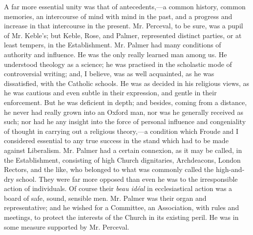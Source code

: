 A far more essential unity was that of antecedents,—a common
history, common memories, an intercourse of mind with mind in the past,
and a progress and increase in
that intercourse in the present. Mr.
Perceval, to be sure, was a pupil of Mr. Keble's; but Keble, Rose, and
Palmer, represented distinct parties, or at least tempers, in the
Establishment. Mr. Palmer had many conditions of authority and
influence. He was the only really learned man among us. He understood
theology as a science; he was practised in the scholastic mode of
controversial writing; and, I believe, was as well acquainted, as he was
dissatisfied, with the Catholic schools. He was as decided in his
religious views, as he was cautious and even subtle in their expression,
and gentle in their enforcement. But he was deficient in depth; and
besides, coming from a distance, he never had really grown into an
Oxford man, nor was he generally received as such; nor had he any
insight into the force of personal influence and congeniality of thought
in carrying out a religious theory,—a condition which Froude and I
considered essential to any true success in the stand which had to be
made against Liberalism. Mr. Palmer had a certain connexion, as it may
be called, in the Establishment, consisting of high Church dignitaries,
Archdeacons, London Rectors, and the like, who belonged to what was
commonly called the high-and-dry school. They were far more opposed than
even he was to the irresponsible action of individuals. Of course their \emph{beau
idéal} in ecclesiastical action was a board of safe, sound, sensible
men. Mr. Palmer was their organ and representative; and he wished for a
Committee, an Association, with rules and meetings, to protect the
interests of the Church in its existing peril. He was in some measure
supported by Mr. Perceval.


